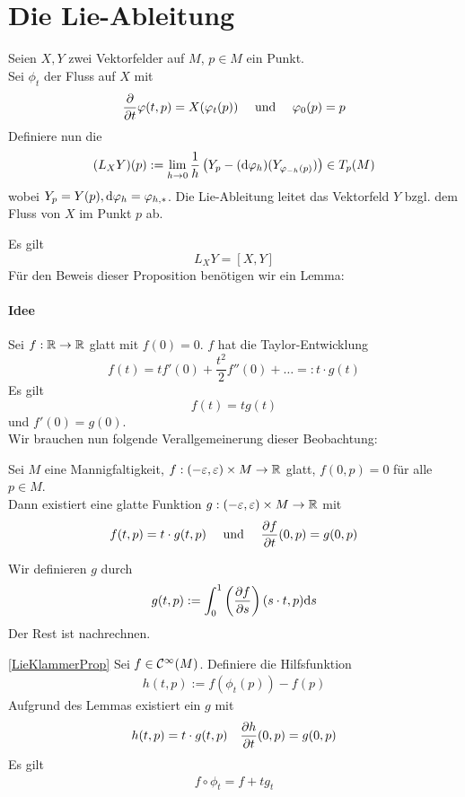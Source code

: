 \newpage
\section{Die Lie-Ableitung}
Seien $X,Y$ zwei Vektorfelder auf $M$, $p \in M$ ein Punkt.\\
Sei $\phi_t$ der Fluss auf $X$ mit
\begin{align*}
\frac{\partial }{\partial t} \varphi(t,p) = X(\varphi_t(p)) && \text{ und } && \varphi_0(p) = p
\end{align*}
Definiere nun die 
\begin{align*}
(L_XY)(p):=\lim\limits_{h\overset{}{\rightarrow} 0} \frac{1}{h} \left(
Y_p 
- (\text{d} \varphi_h)(Y_{\varphi_{-h}(p)})
\right)\in T_p(M)
\end{align*}
wobei $Y_p = Y(p), \text{d} \varphi_h = \varphi_{h,*}$. Die Lie-Ableitung leitet das Vektorfeld $Y$ bzgl. dem Fluss von $X$ im Punkt $p$ ab.

\Prop{}
\label{LieKlammerProp}
Es gilt
\[ L_XY = [X,Y] \]
Für den Beweis dieser Proposition benötigen wir ein Lemma:
\paragraph{Idee}
Sei $f: \mathbb{R} \overset{}{\rightarrow} \mathbb{R}$ glatt mit $f(0) = 0$. $f$ hat die Taylor-Entwicklung
\[ f(t) = t f'(0) + \frac{t^2}{2} f''(0) + \ldots =: t \cdot g(t) \]
Es gilt
\[ f(t) = tg(t) \]
und $f'(0) = g(0)$.\\
Wir brauchen nun folgende Verallgemeinerung dieser Beobachtung:

\Lem{}
Sei $M$ eine Mannigfaltigkeit, $f : (-\varepsilon, \varepsilon) \times M \overset{}{\rightarrow} \mathbb{R}$ glatt, $f(0,p) = 0$ für alle $p \in M$.\\
Dann existiert eine glatte Funktion $g: (-\varepsilon, \varepsilon) \times M \overset{}{\rightarrow} \mathbb{R}$ mit
\begin{align*}
f(t,p) = t\cdot g(t,p) && \text{ und } && \frac{\partial f}{\partial t}(0,p) = g(0,p)
\end{align*}
\begin{Beweis}{}
Wir definieren $g$ durch
\begin{align*}
g(t,p) := \int_{0}^{1} \left(\frac{\partial f}{\partial s}\right) (s\cdot t,p) \text{d} s
\end{align*}
Der Rest ist nachrechnen.
\end{Beweis}

\begin{Beweis}{\ref{LieKlammerProp}}
Sei $f \in \mathcal{C}^{\infty}(M)$. Definiere die Hilfsfunktion
\begin{align*}
h(t,p) := f(\phi_t(p)) - f(p)
\end{align*}
Aufgrund des Lemmas existiert ein $g$ mit
\begin{align*}
h(t,p) = t \cdot g(t,p) && \frac{\partial h}{\partial t}(0,p) = g(0,p)
\end{align*}
Es gilt
\begin{align*}
f \circ \phi_t = f + t g_t
\end{align*}
\end{Beweis}